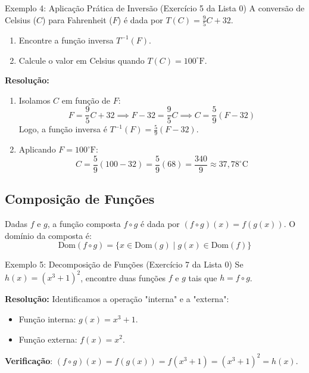\documentclass[12pt,a4paper]{article}
\begin{document}
\begin{exemplo}{Exemplo 4: Aplicação Prática de Inversão (Exercício 5 da Lista 0)}
    A conversão de Celsius ($C$) para Fahrenheit ($F$) é dada por $T(C) = \frac{9}{5}C + 32$.
    \begin{enumerate}
        \item Encontre a função inversa $T^{-1}(F)$.
        \item Calcule o valor em Celsius quando $T(C) = 100^\circ\text{F}$.
    \end{enumerate}

    \tcblower
    \textbf{Resolução:}
    \begin{enumerate}
        \item Isolamos $C$ em função de $F$:
        $$F = \frac{9}{5}C + 32 \implies F - 32 = \frac{9}{5}C \implies C = \frac{5}{9}(F - 32)$$
        Logo, a função inversa é $T^{-1}(F) = \frac{5}{9}(F - 32)$.
        \item Aplicando $F = 100^\circ\text{F}$:
        $$C = \frac{5}{9}(100 - 32) = \frac{5}{9}(68) = \frac{340}{9} \approx 37{,}78^\circ\text{C}$$
    \end{enumerate}
\end{exemplo}

\subsection*{Composição de Funções}
Dadas $f$ e $g$, a função composta $f \circ g$ é dada por $(f \circ g)(x) = f(g(x))$. O domínio da composta é:
$$\text{Dom}(f \circ g) = \{x \in \text{Dom}(g) \mid g(x) \in \text{Dom}(f)\}$$

\begin{exemplo}{Exemplo 5: Decomposição de Funções (Exercício 7 da Lista 0)}
    Se $h(x) = (x^3 + 1)^2$, encontre duas funções $f$ e $g$ tais que $h = f \circ g$.

    \tcblower
    \textbf{Resolução:}
    Identificamos a operação "interna" e a "externa":
    \begin{itemize}
        \item Função interna: $g(x) = x^3 + 1$.
        \item Função externa: $f(x) = x^2$.
    \end{itemize}
    \textbf{Verificação}: $(f \circ g)(x) = f(g(x)) = f(x^3 + 1) = (x^3 + 1)^2 = h(x)$.
\end{exemplo}
\end{document}

